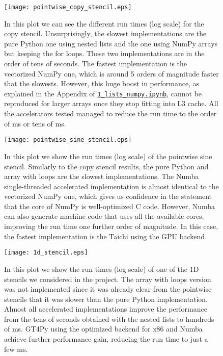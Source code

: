 \documentclass[12pt]{article}
\begin{document}
\begin{figure}[H]
    \centering
    \texttt{[image: pointwise\_copy\_stencil.eps]}
    \caption{In this plot we can see the different run times (log scale) for the copy stencil. Unsurprisingly, the slowest implementations are the pure Python one using nested lists and the one using NumPy arrays but keeping the for loops. These two implementations are in the order of tens of seconds. The fastest implementation is the vectorized NumPy one, which is around 5 orders of magnitude faster that the slowests. However, this huge boost in performance, as explained in the Appendix of \href{run:./1_lists_numpy.ipynb}{\texttt{1\_lists\_numpy.ipynb}}, cannot be reproduced for larger arrays once they stop fitting into L3 cache. All the accelerators tested managed to reduce the run time to the order of ms or tens of ms.}
    \label{fig:stencil_copy}
\end{figure}

\begin{figure}[H]
    \centering
    \texttt{[image: pointwise\_sine\_stencil.eps]}
    \caption{In this plot we show the run times (log scale) of the pointwise sine stencil. Similarly to the copy stencil results, the pure Python and array with loops are the slowest implementations. The Numba single-threaded accelerated implementation is almost identical to the vectorized NumPy one, which gives us confidence in the statement that the core of NumPy is well-optimized C code. However, Numba can also generate machine code that uses all the available cores, improving the run time one further order of magnitude. In this case, the fastest implementation is the Taichi using the GPU backend.}
    \label{fig:stencil_sine}
\end{figure}

\begin{figure}[H]
    \centering
    \texttt{[image: 1d\_stencil.eps]}
    \caption{In this plot we show the run times (log scale) of one of the 1D stencils we considered in the project. The array with loops version was not implemented since it was already clear from the pointwise stencils that it was slower than the pure Python implementation. Almost all accelerated implementations improve the performance from the tens of seconds obtained with the nested lists to hundreds of ms. GT4Py using the optimized backend for x86 and Numba achieve further performance gain, reducing the run time to just a few ms.}
    \label{fig:stencil_1D}
\end{figure}
\end{document}
